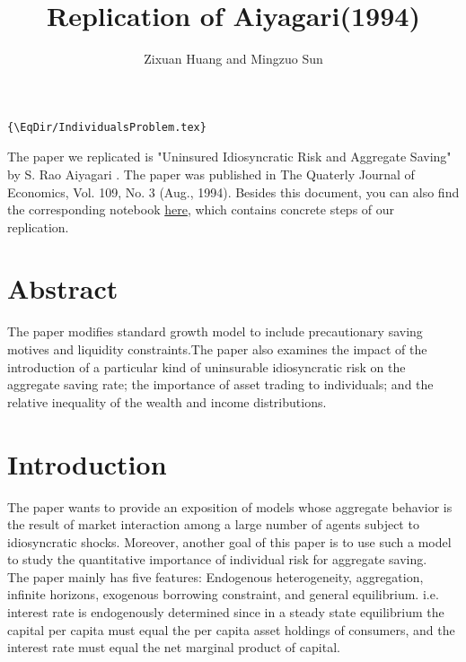 \documentclass[]{article}
\title{Replication of Aiyagari(1994)}
\author{Zixuan Huang and Mingzuo Sun}
\date{}
\providecommand{\EqDir}{Equations}
\begin{document}
\linespread{2}
\maketitle

\begin{verbatim}{\EqDir/IndividualsProblem.tex}
\end{verbatim}


The paper we replicated is "Uninsured Idiosyncratic Risk and Aggregate Saving" by S. Rao Aiyagari \cite{1994}. The paper was published in The Quaterly Journal of Economics, Vol. 109, No. 3 (Aug., 1994). Besides this document, you can also find the corresponding notebook \href{run:../Aiyagari1994QJE.ipynb}{here}, which contains concrete steps of our replication.

\section{Abstract}
The paper modifies standard growth model to include precautionary saving motives and liquidity constraints.The paper also examines the impact of the introduction of a particular kind of uninsurable idiosyncratic risk on the aggregate saving rate; the importance of asset trading to individuals; and the relative inequality of the wealth and income distributions. 

\section{Introduction}
The paper wants to provide an exposition of models whose aggregate behavior is the result of market interaction among a large number of agents subject to idiosyncratic shocks. Moreover, another goal of this paper is to use such a model to study the quantitative importance of individual risk for aggregate saving.\\

The paper mainly has five features: Endogenous heterogeneity, aggregation, infinite horizons, exogenous borrowing constraint, and general equilibrium. i.e. interest rate is endogenously determined since in a steady state equilibrium the capital per capita must equal the per capita asset holdings of consumers, and the interest rate must equal the net marginal product of capital. 
\end{document}
